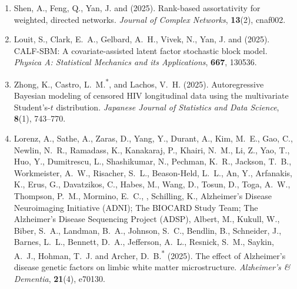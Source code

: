 \begin{enumerate}[resume=journalpubs]
\begin{pubentry}
\par\end{pubentry}
\item\begin{pubentry} Shen, A., Feng, Q., Yan, J. and \PZ{} (2025). Rank-based assortativity for weighted, directed networks. \emph{Journal of Complex Networks}, \textbf{13}(2), cnaf002.

\par\end{pubentry}
\item\begin{pubentry} Louit, S., Clark, E.\ A., Gelbard, A.\ H., Vivek, N., Yan, J. and \PZ{} (2025). CALF-SBM: A covariate-assisted latent factor stochastic block model. \emph{Physica A: Statistical Mechanics and its Applications}, \textbf{667}, 130536.

\par\end{pubentry}
\item\begin{pubentry} Zhong, K., Castro, L.\ M.\textsuperscript{*}, \PZnot{} and Lachos, V.\ H. (2025). Autoregressive Bayesian modeling of censored HIV longitudinal data using the multivariate Student's-$t$ distribution. \emph{Japanese Journal of Statistics and Data Science}, \textbf{8}(1), 743--770.


\par\end{pubentry}
\item\begin{pubentry} Lorenz, A., Sathe, A., Zaras, D., Yang, Y., Durant, A., Kim, M.\ E., Gao, C., Newlin, N.\ R., Ramadass, K., Kanakaraj, P., Khairi, N.\ M., Li, Z., Yao, T., Huo, Y., Dumitrescu, L., Shashikumar, N., Pechman, K.\ R., Jackson, T.\ B., Workmeister, A.\ W., Risacher, S.\ L., Beason-Held, L.\ L., An, Y., Arfanakis, K., Erus, G., Davatzikos, C., Habes, M., Wang, D., Tosun, D., Toga, A.\ W., Thompson, P.\ M., Mormino, E.\ C., \PZnot{}, Schilling, K., Alzheimer's Disease Neuroimaging Initiative (ADNI); The BIOCARD Study Team; The Alzheimer's Disease Sequencing Project (ADSP), Albert, M., Kukull, W., Biber, S.\ A., Landman, B.\ A., Johnson, S.\ C., Bendlin, B., Schneider, J., Barnes, L.\ L., Bennett, D.\ A., Jefferson, A.\ L., Resnick, S.\ M., Saykin, A.\ J., Hohman, T.\ J. and Archer, D.\ B.\textsuperscript{*} (2025). The effect of Alzheimer's disease genetic factors on limbic white matter microstructure. \emph{Alzheimer's \& Dementia}, \textbf{21}(4), e70130.


\end{pubentry}
\end{enumerate}
